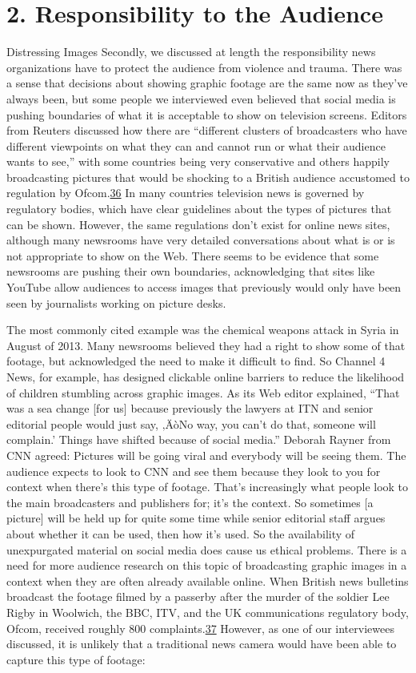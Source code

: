 \documentclass[symmetric, notoc, nobib]{towcenter-book}
\begin{document}
\section{2. Responsibility to the Audience}
Distressing Images
Secondly, we discussed at length the responsibility news organizations have
to protect the audience from violence and trauma. There was a sense that
decisions about showing graphic footage are the same now as they've always
been, but some people we interviewed even believed that social media is
pushing boundaries of what it is acceptable to show on television screens.
Editors from Reuters discussed how there are ``different clusters of broadcasters
who have different viewpoints on what they can and cannot run or
what their audience wants to see,'' with some countries being very conservative
and others happily broadcasting pictures that would be shocking to a
British audience accustomed to regulation by Ofcom.{\href{#endnotes}{36}}
In many countries television news is governed by regulatory bodies, which
have clear guidelines about the types of pictures that can be shown. However,
the same regulations don't exist for online news sites, although many
newsrooms have very detailed conversations about what is or is not appropriate
to show on the Web. There seems to be evidence that some newsrooms
are pushing their own boundaries, acknowledging that sites like
YouTube allow audiences to access images that previously would only have
been seen by journalists working on picture desks.

The most commonly cited example was the chemical weapons attack in
Syria in August of 2013. Many newsrooms believed they had a right to show
some of that footage, but acknowledged the need to make it difficult to find.
So Channel 4 News, for example, has designed clickable online barriers
to reduce the likelihood of children stumbling across graphic images. As
its Web editor explained, ``That was a sea change [for us] because previously
the lawyers at ITN and senior editorial people would just say, ‚ÄòNo way,
you can't do that, someone will complain.' Things have shifted because of
social media.''
Deborah Rayner from CNN agreed:
Pictures will be going viral and everybody will be seeing them. The
audience expects to look to CNN and see them because they look to
you for context when there's this type of footage. That's increasingly
what people look to the main broadcasters and publishers for; it's the
context. So sometimes [a picture] will be held up for quite some time
while senior editorial staff argues about whether it can be used, then
how it's used. So the availability of unexpurgated material on social
media does cause us ethical problems.
There is a need for more audience research on this topic of broadcasting
graphic images in a context when they are often already available online.
When British news bulletins broadcast the footage filmed by a passerby
after the murder of the soldier Lee Rigby in Woolwich, the BBC, ITV, and
the UK communications regulatory body, Ofcom, received roughly 800
complaints.{\href{#endnotes}{37}} However, as one of our interviewees discussed, it is unlikely
that a traditional news camera would have been able to capture this type
of footage:
\end{document}
